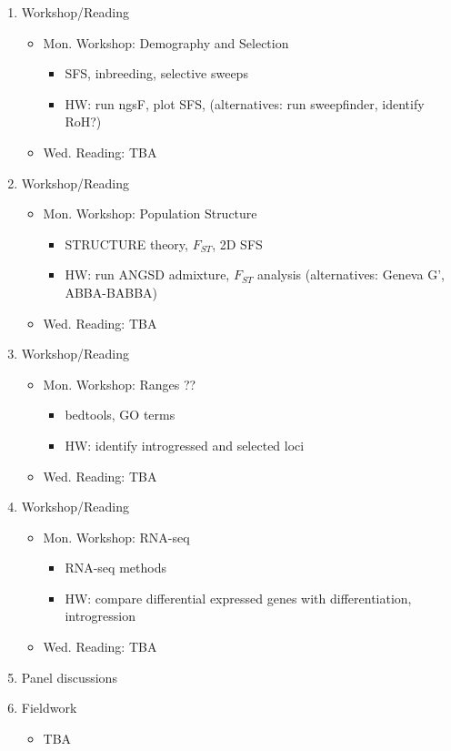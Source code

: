 \documentclass[]{article}
\begin{document}
\begin{enumerate}
\item Workshop/Reading
	\begin{itemize}
	\item Mon. Workshop: Demography and Selection
		\begin{itemize}
		\item SFS, inbreeding, selective sweeps
		\item HW: run ngsF, plot SFS, (alternatives: run sweepfinder, identify RoH?)
		\end{itemize}
	\item Wed. Reading: TBA
\end{itemize}

\item Workshop/Reading
	\begin{itemize}
	\item Mon. Workshop: Population Structure
		\begin{itemize}
		\item STRUCTURE theory, $F_{ST}$, 2D SFS
		\item HW: run ANGSD admixture, $F_{ST}$ analysis (alternatives: Geneva G', ABBA-BABBA)
		\end{itemize}
	\item Wed. Reading: TBA
\end{itemize}

\item Workshop/Reading
	\begin{itemize}
	\item Mon. Workshop: Ranges ??
		\begin{itemize}
		\item bedtools, GO terms
		\item HW: identify introgressed and selected loci
		\end{itemize}
	\item Wed. Reading: TBA
\end{itemize}


\item Workshop/Reading
	\begin{itemize}
	\item Mon. Workshop: RNA-seq
		\begin{itemize}
		\item RNA-seq methods
		\item HW: compare differential expressed genes with differentiation, introgression
		\end{itemize}
	\item Wed. Reading: TBA
\end{itemize}

\item Panel discussions

\item Fieldwork
\begin{itemize}
\item TBA
\end{itemize}


\end{enumerate}
\end{document}
